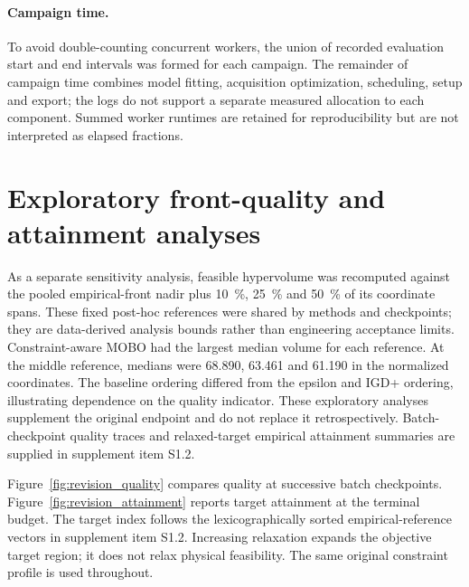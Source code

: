 \documentclass[aps,prab,reprint,superscriptaddress,amsmath,amssymb,floatfix]{revtex4-2}
\begin{document}
\paragraph{Campaign time.} To avoid double-counting concurrent workers, the union of recorded
evaluation start and end intervals was formed for each campaign. The remainder of campaign
time combines model fitting, acquisition optimization, scheduling, setup and export; the logs
do not support a separate measured allocation to each component. Summed worker runtimes are
retained for reproducibility but are not interpreted as elapsed fractions.

\section{Exploratory front-quality and attainment analyses}
\label{app:front_quality}
As a separate sensitivity analysis, feasible hypervolume was recomputed against the pooled
empirical-front nadir plus \SI{10}{\percent}, \SI{25}{\percent} and \SI{50}{\percent} of its
coordinate spans. These fixed post-hoc references were shared by methods and checkpoints;
they are data-derived analysis bounds rather than engineering acceptance limits.
Constraint-aware MOBO had the largest median volume for each reference. At the middle
reference, medians were 68.890, 63.461 and 61.190 in the normalized coordinates. The baseline
ordering differed from the epsilon and IGD+ ordering, illustrating dependence on the quality
indicator. These exploratory analyses supplement the original endpoint and do not replace it
retrospectively. Batch-checkpoint quality traces and relaxed-target empirical attainment
summaries are supplied in supplement item S1.2.

Figure~\ref{fig:revision_quality} compares quality at successive batch checkpoints.
Figure~\ref{fig:revision_attainment} reports target attainment at the terminal budget.
The target index follows the lexicographically sorted empirical-reference vectors in
supplement item S1.2. Increasing relaxation expands the objective target region; it does not relax
physical feasibility. The same original constraint profile is used throughout.
\end{document}
